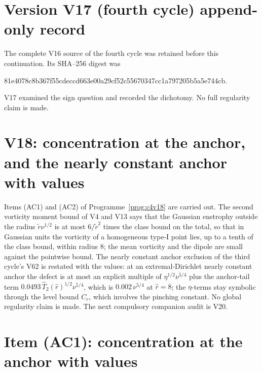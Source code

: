 \documentclass[11pt]{article}
\theoremstyle{plain}
\theoremstyle{definition}
\theoremstyle{remark}
\begin{document}
\section*{Version V17 (fourth cycle) append-only record}

The complete V16 source of the fourth cycle was retained before this
continuation.  Its SHA--256 digest was
\begin{center}\scriptsize\ttfamily
81e4078c8b367f55cdeccd663e00a29cf52c55670347cc1a797205b5a5e744cb.
\end{center}
V17 examined the sign question and recorded the dichotomy.  No full
regularity claim is made.

\section{V18: concentration at the anchor, and the nearly constant anchor with values}
\label{sec:c4v18-entry}

Items (AC1) and (AC2) of Programme~\ref{prog:c4v18} are carried out.
The second vorticity moment bound of V4 and V13 says that the
Gaussian enstrophy outside the radius \(\tilde r\nu^{1/2}\) is at most \(6/\tilde r^2\)
times the class bound on the total, so that in Gaussian units the
vorticity of a homogeneous type-I point lies, up to a tenth of the
class bound, within radius \(8\); the mean vorticity and the dipole
are small against the pointwise bound.  The nearly constant anchor
exclusion of the third cycle's V62 is restated with the values: at
an extremal-Dirichlet nearly constant anchor the defect is at most
an explicit multiple of \(\eta^{1/2}\nu^{5/4}\) plus the anchor-tail term
\(0.0493\,\widehat T_2(\hat r)^{1/2}\nu^{5/4}\), which is \(0.002\,\nu^{5/4}\) at \(\hat r=8\); the
\(\eta\)-terms stay symbolic through the level bound \(C_r\), which involves
the pinching constant.  No global regularity claim is made.  The
next compulsory companion audit is V20.

\section{Item (AC1): concentration at the anchor with values}
\label{sec:c4v18-concentration}
\end{document}
